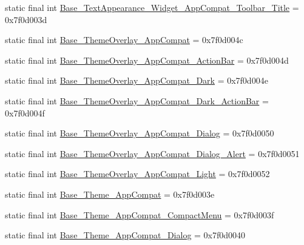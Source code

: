 \begin{DoxyCompactItemize}
\item 
static final int \mbox{\hyperlink{classandroid_1_1support_1_1v7_1_1appcompat_1_1_r_1_1style_afc0aa5f87799755400758b40a2ea23b1}{Base\+\_\+\+Text\+Appearance\+\_\+\+Widget\+\_\+\+App\+Compat\+\_\+\+Toolbar\+\_\+\+Title}} = 0x7f0d003d
\item 
static final int \mbox{\hyperlink{classandroid_1_1support_1_1v7_1_1appcompat_1_1_r_1_1style_ae4b85b193267b846c5a1c56dad179d1c}{Base\+\_\+\+Theme\+Overlay\+\_\+\+App\+Compat}} = 0x7f0d004c
\item 
static final int \mbox{\hyperlink{classandroid_1_1support_1_1v7_1_1appcompat_1_1_r_1_1style_a65e1bb81ae73752bcc8d4bf7e97a14dd}{Base\+\_\+\+Theme\+Overlay\+\_\+\+App\+Compat\+\_\+\+Action\+Bar}} = 0x7f0d004d
\item 
static final int \mbox{\hyperlink{classandroid_1_1support_1_1v7_1_1appcompat_1_1_r_1_1style_a3e8cd9266f191c0fc16f3473f8891e6a}{Base\+\_\+\+Theme\+Overlay\+\_\+\+App\+Compat\+\_\+\+Dark}} = 0x7f0d004e
\item 
static final int \mbox{\hyperlink{classandroid_1_1support_1_1v7_1_1appcompat_1_1_r_1_1style_a24212e31d5a8f471486aaef0c26a2345}{Base\+\_\+\+Theme\+Overlay\+\_\+\+App\+Compat\+\_\+\+Dark\+\_\+\+Action\+Bar}} = 0x7f0d004f
\item 
static final int \mbox{\hyperlink{classandroid_1_1support_1_1v7_1_1appcompat_1_1_r_1_1style_a1a7a7bde0fa3523d7d498c9b59212d70}{Base\+\_\+\+Theme\+Overlay\+\_\+\+App\+Compat\+\_\+\+Dialog}} = 0x7f0d0050
\item 
static final int \mbox{\hyperlink{classandroid_1_1support_1_1v7_1_1appcompat_1_1_r_1_1style_ad2c801d2143d2c12fd0d6159046b38a2}{Base\+\_\+\+Theme\+Overlay\+\_\+\+App\+Compat\+\_\+\+Dialog\+\_\+\+Alert}} = 0x7f0d0051
\item 
static final int \mbox{\hyperlink{classandroid_1_1support_1_1v7_1_1appcompat_1_1_r_1_1style_ad811f28779abf2944bb85a604e57c055}{Base\+\_\+\+Theme\+Overlay\+\_\+\+App\+Compat\+\_\+\+Light}} = 0x7f0d0052
\item 
static final int \mbox{\hyperlink{classandroid_1_1support_1_1v7_1_1appcompat_1_1_r_1_1style_a8e435bd44b683737594e2074394d738e}{Base\+\_\+\+Theme\+\_\+\+App\+Compat}} = 0x7f0d003e
\item 
static final int \mbox{\hyperlink{classandroid_1_1support_1_1v7_1_1appcompat_1_1_r_1_1style_a0c56917b296881cef762400b9c529cd6}{Base\+\_\+\+Theme\+\_\+\+App\+Compat\+\_\+\+Compact\+Menu}} = 0x7f0d003f
\item 
static final int \mbox{\hyperlink{classandroid_1_1support_1_1v7_1_1appcompat_1_1_r_1_1style_a38182a25356e4f9666256f98e5ca7125}{Base\+\_\+\+Theme\+\_\+\+App\+Compat\+\_\+\+Dialog}} = 0x7f0d0040

\end{DoxyCompactItemize}
